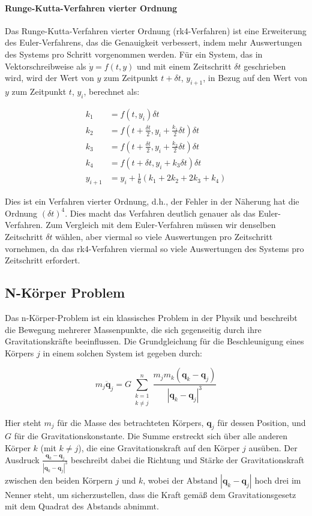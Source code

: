 \documentclass[a4paper,12pt,twoside]{article}
\begin{document}
\paragraph{Runge-Kutta-Verfahren vierter Ordnung}
Das Runge-Kutta-Verfahren vierter Ordnung (rk4-Verfahren) ist eine Erweiterung des Euler-Verfahrens, das die Genauigkeit verbessert, indem mehr Auswertungen des Systems pro Schritt vorgenommen werden. Für ein System, das in Vektorschreibweise als $\dot{y} = f(t, y)$ und mit einem Zeitschritt $\delta t$ geschrieben wird, wird der Wert von $y$ zum Zeitpunkt $t + \delta t$, $y_{i+1}$, in Bezug auf den Wert von $y$ zum Zeitpunkt $t$, $y_i$, berechnet als:

\begin{align*}
    k_1 &= f(t, y_i)\delta t \\
    k_2 &= f\left(t + \frac{\delta t}{2}, y_i + \frac{k_1}{2} \delta t \right) \delta t \\
    k_3 &= f\left(t + \frac{\delta t}{2}, y_i + \frac{k_2}{2} \delta t \right) \delta t \\
    k_4 &= f(t + \delta t, y_i + k_3 \delta t) \delta t \\
    y_{i+1} &= y_i + \frac{1}{6}(k_1 + 2k_2 + 2k_3 + k_4)
\end{align*}

Dies ist ein Verfahren vierter Ordnung, d.h., der Fehler in der Näherung hat die Ordnung $(\delta t)^4$. Dies macht das Verfahren deutlich genauer als das Euler-Verfahren. Zum Vergleich mit dem Euler-Verfahren müssen wir denselben Zeitschritt $\delta t$ wählen, aber viermal so viele Auswertungen pro Zeitschritt vornehmen, da das rk4-Verfahren viermal so viele Auswertungen des Systems pro Zeitschritt erfordert.




\subsection{N-Körper Problem}
Das n-Körper-Problem ist ein klassisches Problem in der Physik und beschreibt die Bewegung mehrerer Massenpunkte, die sich gegenseitig durch ihre Gravitationskräfte beeinflussen. Die Grundgleichung für die Beschleunigung eines Körpers \( j \) in einem solchen System ist gegeben durch:

\[
m_j \ddot{\mathbf{q}}_j = G \sum_{\substack{k=1 \\ k \neq j}}^n \frac{m_j m_k (\mathbf{q}_k - \mathbf{q}_j)}{|\mathbf{q}_k - \mathbf{q}_j|^3}
\]

Hier steht \( m_j \) für die Masse des betrachteten Körpers, \( \mathbf{q}_j \) für dessen Position, und \( G \) für die Gravitationskonstante. Die Summe erstreckt sich über alle anderen Körper \( k \) (mit \( k \neq j \)), die eine Gravitationskraft auf den Körper \( j \) ausüben. Der Ausdruck \( \frac{\mathbf{q}_k - \mathbf{q}_j}{|\mathbf{q}_k - \mathbf{q}_j|^3} \) beschreibt dabei die Richtung und Stärke der Gravitationskraft zwischen den beiden Körpern \( j \) und \( k \), wobei der Abstand \( |\mathbf{q}_k - \mathbf{q}_j| \) hoch drei im Nenner steht, um sicherzustellen, dass die Kraft gemäß dem Gravitationsgesetz mit dem Quadrat des Abstands abnimmt.
\end{document}
